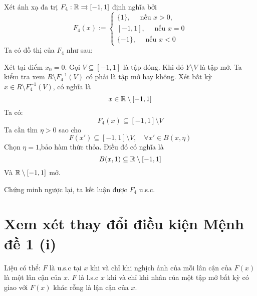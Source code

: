 \documentclass{article}
\begin{document}
\begin{example}
    Xét ánh xạ đa trị $F_4: \mathbb{R} \rightrightarrows [-1, 1]$ định nghĩa bởi
    \begin{equation}
        F_4(x) := \begin{cases}
            \{1\},\quad\text{ nếu } x > 0,\\
            [-1, 1],\quad\text{ nếu } x = 0\\
            \{-1\},\quad\text{ nếu } x <0
        \end{cases}
    \end{equation}
    Ta có đồ thị của $F_4$ như sau:
    \begin{figure}[H]
        \centering
        
        \label{fig:f4}
    \end{figure}
    Xét tại điểm $x_0 = 0$. Gọi $V \subseteq [-1, 1]$ là tập đóng. Khi đó $Y \setminus V$ là tập mở. Ta kiểm tra xem $R \setminus F_4^{-1}(V)$ có phải là tập mở hay không. Xét bất kỳ $x \in R \setminus F_4^{-1}(V)$, có nghĩa là 
    \begin{equation}
        x \in \mathbb{R} \setminus [-1, 1]
    \end{equation}
    Ta có:
    \begin{equation}
        F_4(x) \subseteq [-1, 1] \setminus V
    \end{equation}
    Ta cần tìm $\eta > 0$ sao cho 
    \begin{equation}
        F(x') \subseteq [-1, 1] \setminus V, \quad \forall x' \in B(x, \eta)
    \end{equation}
    Chọn $\eta = 1$,bảo hàm thức thỏa.
    Điều đó có nghĩa là 
    \begin{equation}
        B(x, 1) \subseteq \mathbb{R} \setminus [-1, 1] 
    \end{equation}
    Và $\mathbb{R} \setminus [-1, 1]$ mở.

    Chứng minh ngược lại, ta kết luận được $F_4$ u.s.c.
\end{example}

\section{Xem xét thay đổi điều kiện Mệnh đề 1 (i)}

\begin{question}
    Liệu có thể: $F$ là u.s.c tại $x$ khi và chỉ khi nghịch ảnh của mỗi lân cận của $F(x)$ là một lân cận của $x$. $F$ là l.s.c $x$ khi và chỉ khi nhân của một tập mở bất kỳ có giao với $F(x)$ khác rỗng là lận cận của $x$.
\end{question}
\end{document}
